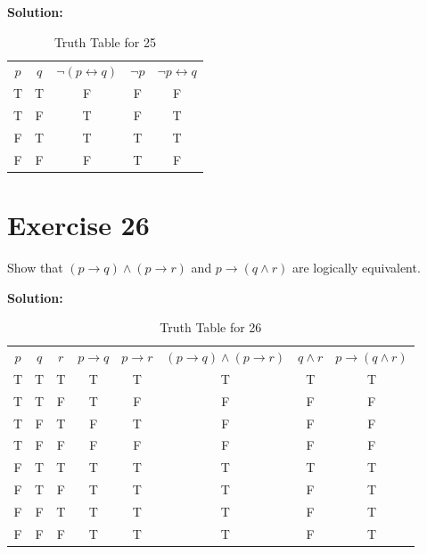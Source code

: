\documentclass{Axon}
\begin{document}
\noindent
\textbf{Solution:}
\begin{table}[ht]
    \centering
    \begin{tabular}{c|c|c|c|c}
        \(p\) & \(q\) & \(\lnot(p \leftrightarrow q)\) & \(\lnot p\) & \(\lnot p \leftrightarrow q\) \\
        T     & T     & F                              & F           & F                             \\
        T     & F     & T                              & F           & T                             \\
        F     & T     & T                              & T           & T                             \\
        F     & F     & F                              & T           & F
    \end{tabular}
    \caption{Truth Table for 25}
\end{table}

\section*{Exercise 26}
Show that \((p \to q) \land (p \to r)\) and \(p \to (q \land r)\) are logically equivalent.

\noindent
\textbf{Solution:}
\begin{table}[ht]
    \centering
    \begin{tabular}{c|c|c|c|c|c|c|c}
        \(p\) & \(q\) & \(r\) & \(p \to q\) & \(p \to r\) & \((p \to q) \land (p \to r)\) & \(q \land r\) & \(p \to (q \land r)\) \\
        T     & T     & T     & T           & T           & T                             & T             & T                     \\
        T     & T     & F     & T           & F           & F                             & F             & F                     \\
        T     & F     & T     & F           & T           & F                             & F             & F                     \\
        T     & F     & F     & F           & F           & F                             & F             & F                     \\
        F     & T     & T     & T           & T           & T                             & T             & T                     \\
        F     & T     & F     & T           & T           & T                             & F             & T                     \\
        F     & F     & T     & T           & T           & T                             & F             & T                     \\
        F     & F     & F     & T           & T           & T                             & F             & T                     \\
    \end{tabular}
    \caption{Truth Table for 26}
\end{table}
\end{document}
